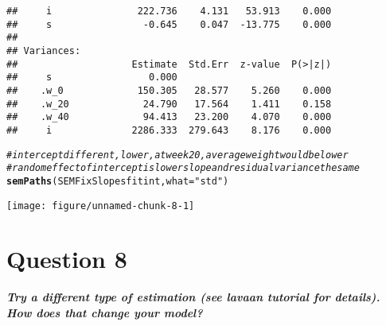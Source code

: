 \documentclass{article}\usepackage[]{graphicx}\usepackage[]{color}
\makeatletter
\def\maxwidth{ %
  \ifdim\Gin@nat@width>\linewidth
    \linewidth
  \else
    \Gin@nat@width
  \fi
}
\newcommand{\hlstr}[1]{\textcolor[rgb]{0.192,0.494,0.8}{#1}}%
\newcommand{\hlcom}[1]{\textcolor[rgb]{0.678,0.584,0.686}{\textit{#1}}}%
\newcommand{\hlstd}[1]{\textcolor[rgb]{0.345,0.345,0.345}{#1}}%
\newcommand{\hlkwc}[1]{\textcolor[rgb]{0.333,0.667,0.333}{#1}}%
\newcommand{\hlkwd}[1]{\textcolor[rgb]{0.737,0.353,0.396}{\textbf{#1}}}%
\newenvironment{kframe}{%
 \def\at@end@of@kframe{}%
 \ifinner\ifhmode%
  \def\at@end@of@kframe{\end{minipage}}%
  \begin{minipage}{\columnwidth}%
 \fi\fi%
 \def\FrameCommand##1{\hskip\@totalleftmargin \hskip-\fboxsep
 \colorbox{shadecolor}{##1}\hskip-\fboxsep
     \hskip-\linewidth \hskip-\@totalleftmargin \hskip\columnwidth}%
 \MakeFramed {\advance\hsize-\width
   \@totalleftmargin\z@ \linewidth\hsize
   \@setminipage}}%
 {\par\unskip\endMakeFramed%
 \at@end@of@kframe}
\newenvironment{knitrout}{}{} %
\makeatother
\begin{document}
\begin{knitrout}
\begin{kframe}
\begin{verbatim}
##     i               222.736    4.131   53.913    0.000
##     s                -0.645    0.047  -13.775    0.000
## 
## Variances:
##                    Estimate  Std.Err  z-value  P(>|z|)
##     s                 0.000                           
##    .w_0             150.305   28.577    5.260    0.000
##    .w_20             24.790   17.564    1.411    0.158
##    .w_40             94.413   23.200    4.070    0.000
##     i              2286.333  279.643    8.176    0.000
\end{verbatim}
\begin{alltt}
\hlcom{# intercept different, lower, at week 20, average weight would be lower}
\hlcom{# random effect of intercept is lower slope and residual variance the same}
\hlkwd{semPaths}\hlstd{(SEMFixSlopesfitint,} \hlkwc{what} \hlstd{=} \hlstr{"std"}\hlstd{)}
\end{alltt}


{\ttfamily\noindent\color{warningcolor}{\#\# Warning in qgraph(Edgelist, labels = nLab, bidirectional = Bidir, directed = Directed, : Non-finite weights are omitted}}\end{kframe}
\texttt{[image: figure/unnamed-chunk-8-1]} 

\end{knitrout}

\section{Question 8}
\textbf{\large{\textit{
Try a different type of estimation (see lavaan tutorial for details). How does that change your model?
}}}
\end{document}
